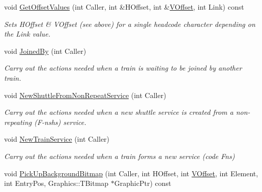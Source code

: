 \begin{DoxyCompactItemize}
\item 
\mbox{\label{class_t_train_aa973b7a0ecaef5077fd56398419f9104}} 
void \mbox{\hyperlink{class_t_train_aa973b7a0ecaef5077fd56398419f9104}{Get\+Offset\+Values}} (int Caller, int \&H\+Offset, int \&\mbox{\hyperlink{class_t_train_a4c8b153a620229a3d9cc54f64ffa5f4a}{V\+Offset}}, int Link) const
\begin{DoxyCompactList}\small\item\em Sets H\+Offset \& V\+Offset (see above) for a single headcode character depending on the Link value. \end{DoxyCompactList}\item 
\mbox{\label{class_t_train_a6c3479378d35f9041c38d80f03686b41}} 
void \mbox{\hyperlink{class_t_train_a6c3479378d35f9041c38d80f03686b41}{Joined\+By}} (int Caller)
\begin{DoxyCompactList}\small\item\em Carry out the actions needed when a train is waiting to be joined by another train. \end{DoxyCompactList}\item 
\mbox{\label{class_t_train_a56fcfe4b9a3cef988bbeb4f4766372aa}} 
void \mbox{\hyperlink{class_t_train_a56fcfe4b9a3cef988bbeb4f4766372aa}{New\+Shuttle\+From\+Non\+Repeat\+Service}} (int Caller)
\begin{DoxyCompactList}\small\item\em Carry out the actions needed when a new shuttle service is created from a non-\/repeating (F-\/nshs) service. \end{DoxyCompactList}\item 
\mbox{\label{class_t_train_a75a2e9017b96e2a8f2a1edbd01c2cd68}} 
void \mbox{\hyperlink{class_t_train_a75a2e9017b96e2a8f2a1edbd01c2cd68}{New\+Train\+Service}} (int Caller)
\begin{DoxyCompactList}\small\item\em Carry out the actions needed when a train forms a new service (code Fns) \end{DoxyCompactList}\item 
void \mbox{\hyperlink{class_t_train_af92ae73f1be23475e7ae424306cd4866}{Pick\+Up\+Background\+Bitmap}} (int Caller, int H\+Offset, int \mbox{\hyperlink{class_t_train_a4c8b153a620229a3d9cc54f64ffa5f4a}{V\+Offset}}, int Element, int Entry\+Pos, Graphics\+::\+T\+Bitmap $\ast$Graphic\+Ptr) const

\end{DoxyCompactItemize}
